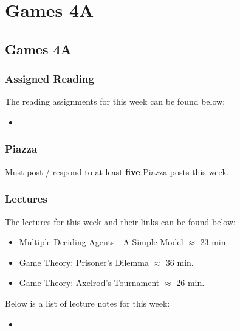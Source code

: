 \clearpage

\renewcommand{\ChapTitle}{Games 4A}
\renewcommand{\SectionTitle}{Games 4A}

\chapter{\ChapTitle}
\section{\SectionTitle}

\subsection{Assigned Reading}

The reading assignments for this week can be found below:

\begin{itemize}
    \item {}
\end{itemize}

\subsection{Piazza}

Must post / respond to at least \textbf{five} Piazza posts this week.

\subsection{Lectures}

The lectures for this week and their links can be found below:

\begin{itemize}
    \item \href{https://www.youtube.com/watch?v=JDg9Z2W9Mfk}{Multiple Deciding Agents - A Simple Model} $\approx$ 23 min.
    \item \href{https://www.youtube.com/watch?v=6rD16HNCs50}{Game Theory: Prisoner's Dilemma} $\approx$ 36 min.
    \item \href{https://www.youtube.com/watch?v=5D5huKHZgu0}{Game Theory: Axelrod's Tournament} $\approx$ 26 min.
\end{itemize}

\noindent Below is a list of lecture notes for this week:

\begin{itemize}
    \item {}
\end{itemize}

